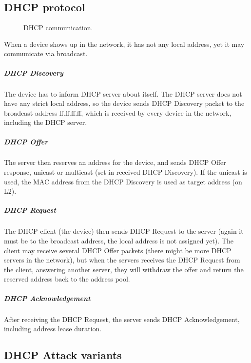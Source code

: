 \documentclass[10pt,a4paper,titlepage]{article}
\begin{document}
    
    
    \subsection*{DHCP protocol}
    
    \begin{figure}[h!]
        \begin{center}
            \caption{ DHCP communication. \label{fig:dhcp} \cite{DHCPcomm}}
        \end{center}
    \end{figure}
    
    When a device shows up in the network, it has not any local address, yet
    it may communicate via broadcast.
    
    \subparagraph{DHCP Discovery}
    The device has to inform DHCP server about itself. The DHCP server does not have
    any strict local address, so the device sends DHCP Discovery packet to the
    broadcast address ff.ff.ff.ff, which is received by every device in the
    network, including the DHCP server.
    
    \subparagraph{DHCP Offer}
    The server then reserves an address for the device, and sends DHCP Offer
    response, unicast or multicast (set in received DHCP Discovery). If the
    unicast is used, the MAC address from the DHCP Discovery is used as target
    address (on L2).
    
    \subparagraph{DHCP Request}
    The DHCP client (the device) then sends DHCP Request to the server (again
    it must be to the broadcast address, the local address is not assigned yet).
    The client may receive several DHCP Offer packets (there might be more DHCP
    servers in the network), but when the servers receives the DHCP Request from
    the client, answering another server, they will withdraw the offer and return
    the reserved address back to the address pool.
    
    \subparagraph{DHCP Acknowledgement}
    After receiving the DHCP Request, the server sends DHCP Acknowledgement,
    including address lease duration. \cite{mistrovstvivsitich} \cite{DHCPwikipedia}
    \cite{IPKDHCP}
    
    
    
    \subsection*{DHCP Attack variants}
    
\end{document}
